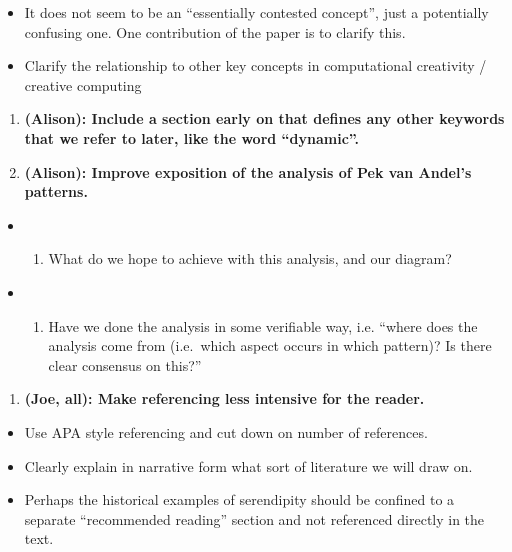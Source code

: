 \begin{itemize}
\itemsep1pt\parskip0pt
\item
  It does not seem to be an ``essentially contested concept'', just a
  potentially confusing one. One contribution of the paper is to clarify
  this.
\item
  Clarify the relationship to other key concepts in computational
  creativity / creative computing
\end{itemize}

\begin{enumerate}
\def\labelenumi{\arabic{enumi}.}
\setcounter{enumi}{7}
\itemsep1pt\parskip0pt
\item
  \textbf{(Alison): Include a section early on that defines any other
  keywords that we refer to later, like the word ``dynamic''.}
\item
  \textbf{(Alison): Improve exposition of the analysis of Pek van
  Andel's patterns.}
\end{enumerate}

\begin{itemize}
\item
  \begin{enumerate}
  \def\labelenumi{(\arabic{enumi})}
  \itemsep1pt\parskip0pt
  \item
    What do we hope to achieve with this analysis, and our diagram?
  \end{enumerate}
\item
  \begin{enumerate}
  \def\labelenumi{(\arabic{enumi})}
  \setcounter{enumi}{1}
  \itemsep1pt\parskip0pt
  \item
    Have we done the analysis in some verifiable way, i.e. ``where does
    the analysis come from (i.e.~which aspect occurs in which pattern)?
    Is there clear consensus on this?''
  \end{enumerate}
\end{itemize}

\begin{enumerate}
\def\labelenumi{\arabic{enumi}.}
\setcounter{enumi}{9}
\itemsep1pt\parskip0pt
\item
  \textbf{(Joe, all): Make referencing less intensive for the reader.}
\end{enumerate}

\begin{itemize}
\itemsep1pt\parskip0pt
\item
  Use APA style referencing and cut down on number of references.
\item
  Clearly explain in narrative form what sort of literature we will draw
  on.
\item
  Perhaps the historical examples of serendipity should be confined to a
  separate ``recommended reading'' section and not referenced directly
  in the text.
\end{itemize}

